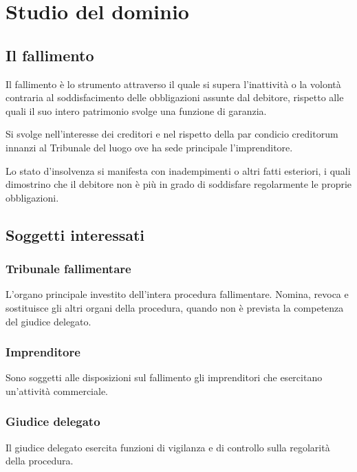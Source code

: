 \section{Studio del dominio}
\nocite{AmmissionePassivo:Online}
\nocite{ChirografariCuozzo:Online}
\nocite{Curatore:Online}
\nocite{IstanzaFallimentare:Online}
\nocite{ModelliTemplate:Online}
\nocite{wiki:chirografario}
\nocite{wiki:fallimento}


\subsection{Il fallimento}
Il fallimento è lo strumento attraverso il quale si supera l'inattività o la volontà contraria al soddisfacimento delle obbligazioni assunte dal debitore, rispetto alle quali il suo intero patrimonio svolge una funzione di garanzia.

Si svolge nell'interesse dei creditori e nel rispetto della par condicio creditorum innanzi al Tribunale del luogo ove ha sede principale l'imprenditore.

Lo stato d'insolvenza si manifesta con inadempimenti o altri fatti esteriori, i quali dimostrino che il debitore non è più in grado di soddisfare regolarmente le proprie obbligazioni.

\subsection{Soggetti interessati}

\subsubsection{Tribunale fallimentare}
L'organo principale investito dell'intera procedura fallimentare. Nomina, revoca e sostituisce gli altri organi della procedura, quando non è prevista la competenza del giudice delegato.

\subsubsection{Imprenditore}
Sono soggetti alle disposizioni sul fallimento gli imprenditori che esercitano un'attività commerciale.

\subsubsection{Giudice delegato}
Il giudice delegato esercita funzioni di vigilanza e di controllo sulla regolarità della procedura.

